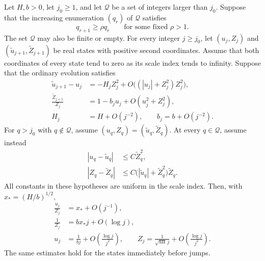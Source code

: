 \begin{lemma}
\label{lem:trajectory-sparse-splice}
Let $H,b>0$, let $j_0\ge1$, and let $\mathcal Q$ be a set of integers
larger than $j_0$.  Suppose that the increasing enumeration $(q_r)$ of
$\mathcal Q$ satisfies
\[
 q_{r+1}\ge \rho q_r
 \qquad\text{for some fixed }\rho>1.
\]
The set $\mathcal Q$ may also be finite or empty.  For every integer
$j\ge j_0$, let $(u_j,Z_j)$ and
$(\widetilde u_{j+1},\widetilde Z_{j+1})$ be real states with positive
second coordinates.  Assume that both coordinates of every state tend
to zero as its scale index tends to infinity.  Suppose that the
ordinary evolution satisfies
\begin{align}
 \widetilde u_{j+1}-u_j
   &=-H_j Z_j^2
       +O\bigl((|u_j|+Z_j^2)Z_j^2\bigr),
       \label{eq:trajectory-ordinary-u}\\
 \frac{\widetilde Z_{j+1}}{Z_j}
   &=1-b_j u_j+O(u_j^2+Z_j^2),
       \label{eq:trajectory-ordinary-z}\\
 H_j&=H+O(j^{-2}),\qquad b_j=b+O(j^{-2}).
       \label{eq:trajectory-coefficients}
\end{align}
For $q>j_0$ with $q\notin\mathcal Q$, assume
$(u_q,Z_q)=(\widetilde u_q,\widetilde Z_q)$.  At every $q\in\mathcal Q$,
assume instead
\begin{align}
 |u_q-\widetilde u_q|&\le C\widetilde Z_q^2,
       \label{eq:trajectory-jump-u}\\
 |Z_q-\widetilde Z_q|
   &\le C\bigl(|\widetilde u_q|+\widetilde Z_q^2\bigr)
                  \widetilde Z_q.
       \label{eq:trajectory-jump-z}
\end{align}
All constants in these hypotheses are uniform in the scale index.
Then, with $x_*=(H/b)^{1/2}$,
\begin{align}
 \frac{u_j}{Z_j}&=x_*+O(j^{-1}),
       \label{eq:trajectory-ratio}\\
 \frac1{Z_j}&=b x_*j+O(\log j),
       \label{eq:trajectory-inverse}\\
 u_j&=\frac1{bj}+O\left(\frac{\log j}{j^2}\right),\qquad
 Z_j=\frac1{\sqrt{bH}\,j}
                 +O\left(\frac{\log j}{j^2}\right).
       \label{eq:trajectory-asymptotics}
\end{align}
The same estimates hold for the states immediately before jumps.
\end{lemma}

